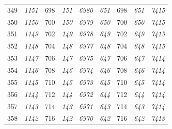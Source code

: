 \documentclass[10pt,fleqn]{article}
\begin{document}
\begin{longtable}{c|cccccccc}
349 & {\color{blue} \it 1151 \rm} & {\color{black} 698} & {\color{blue} \it 151 \rm} & {\color{blue} \it 6980 \rm} & {\color{blue} \it 651 \rm} & {\color{black} 698} & {\color{blue} \it 651 \rm} & {\color{blue} \it 7415 \rm} \\
350 & {\color{blue} \it 1150 \rm} & {\color{black} 700} & {\color{blue} \it 150 \rm} & {\color{blue} \it 6979 \rm} & {\color{blue} \it 650 \rm} & {\color{black} 700} & {\color{blue} \it 650 \rm} & {\color{blue} \it 7415 \rm} \\
351 & {\color{blue} \it 1149 \rm} & {\color{black} 702} & {\color{blue} \it 149 \rm} & {\color{blue} \it 6978 \rm} & {\color{blue} \it 649 \rm} & {\color{black} 702} & {\color{blue} \it 649 \rm} & {\color{blue} \it 7415 \rm} \\
352 & {\color{blue} \it 1148 \rm} & {\color{black} 704} & {\color{blue} \it 148 \rm} & {\color{blue} \it 6977 \rm} & {\color{blue} \it 648 \rm} & {\color{black} 704} & {\color{blue} \it 648 \rm} & {\color{blue} \it 7415 \rm} \\
353 & {\color{blue} \it 1147 \rm} & {\color{black} 706} & {\color{blue} \it 147 \rm} & {\color{blue} \it 6975 \rm} & {\color{blue} \it 647 \rm} & {\color{black} 706} & {\color{blue} \it 647 \rm} & {\color{blue} \it 7414 \rm} \\
354 & {\color{blue} \it 1146 \rm} & {\color{black} 708} & {\color{blue} \it 146 \rm} & {\color{blue} \it 6974 \rm} & {\color{blue} \it 646 \rm} & {\color{black} 708} & {\color{blue} \it 646 \rm} & {\color{blue} \it 7414 \rm} \\
355 & {\color{blue} \it 1145 \rm} & {\color{black} 710} & {\color{blue} \it 145 \rm} & {\color{blue} \it 6973 \rm} & {\color{blue} \it 645 \rm} & {\color{black} 710} & {\color{blue} \it 645 \rm} & {\color{blue} \it 7414 \rm} \\
356 & {\color{blue} \it 1144 \rm} & {\color{black} 712} & {\color{blue} \it 144 \rm} & {\color{blue} \it 6972 \rm} & {\color{blue} \it 644 \rm} & {\color{black} 712} & {\color{blue} \it 644 \rm} & {\color{blue} \it 7414 \rm} \\
357 & {\color{blue} \it 1143 \rm} & {\color{black} 714} & {\color{blue} \it 143 \rm} & {\color{blue} \it 6971 \rm} & {\color{blue} \it 643 \rm} & {\color{black} 714} & {\color{blue} \it 643 \rm} & {\color{blue} \it 7414 \rm} \\
358 & {\color{blue} \it 1142 \rm} & {\color{black} 716} & {\color{blue} \it 142 \rm} & {\color{blue} \it 6970 \rm} & {\color{blue} \it 642 \rm} & {\color{black} 716} & {\color{blue} \it 642 \rm} & {\color{blue} \it 7413 \rm} \\

\end{longtable}
\end{document}
